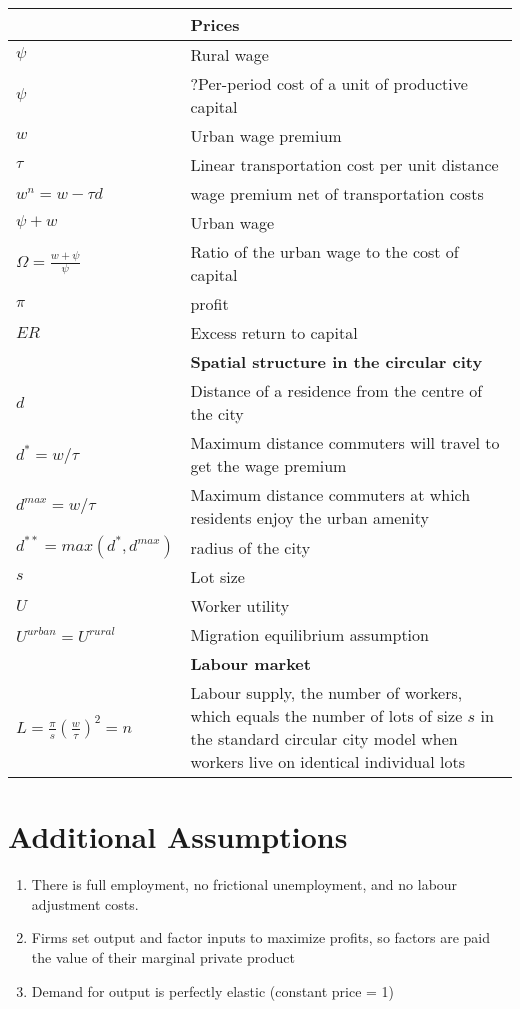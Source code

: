 \begin{longtable}{lp{10cm}}
		& \textbf{Prices}\\ \hline
$\psi$  &  Rural wage\\
$\psi$  &  ?Per-period cost of a unit of productive capital\\
$w$     &  Urban wage premium\\
$\tau$  &  Linear transportation cost per unit distance\\
$w^n=w-\tau d$ & wage  premium net of transportation costs\\
$\psi + w$  &  Urban wage\\
$\Omega=\frac{w+\psi}{\psi}$  &  Ratio of the urban wage to the  cost of capital\\
$\pi$	 & profit\\
$ER$	& Excess return to capital\\
\hline
		&\textbf{Spatial structure in the circular city}\\ \hline		
$d$  &  Distance of a residence from the centre of the city\\
$d^* = w/\tau$  &  Maximum distance commuters will travel to get the wage premium\\
$d^{max} = w/\tau$  &  Maximum distance commuters at which residents enjoy the urban amenity\\
$d^{**} = max(d^*, d^{max})$  &  radius of the city\\
$s$ & Lot size\\
$U$  &  Worker utility\\%
$U^{urban}=U^{rural} $  &   Migration equilibrium assumption\\
\hline
		& \textbf{Labour market}\\ \hline
$L= \frac{\pi}{s}(\frac{w}{\tau})^2 = n$  &  
Labour supply, the number of workers, which equals the number of lots of size $s$ in the standard circular city model when workers live on identical individual lots\\%
\hline


\end{longtable}  
\section*{Additional Assumptions}
\begin{enumerate}
\item There is full employment, no frictional unemployment, and no labour adjustment costs.
\item Firms set output and factor inputs to maximize profits, so factors are paid the value of their marginal private product
\item Demand for output is perfectly elastic (constant price = 1)

\end{enumerate}

